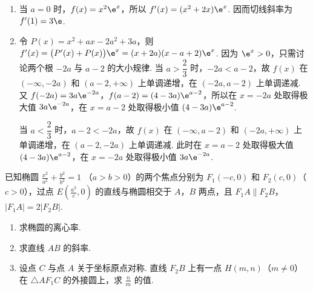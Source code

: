 \begin{solution}
\begin{enumerate}
\item 当 \(a=0\) 时，\(f(x)=x^2\e^x\)，所以 \(f'(x)=(x^2+2x)\e^x\). 因而切线斜率为 \(f'(1)=3\e\).
\item 令 \(P(x)=x^2+ax-2a^2+3a\)，则
\(f'(x)=\bigl(P'(x)+P(x)\bigr)\e^x=(x+2a)(x-a+2)\e^x\).
因为 \(\e^x>0\)，只需讨论两个根 \(-2a\) 与 \(a-2\) 的大小规律. 当 \(a>\dfrac23\) 时，\(-2a<a-2\)，故 \(f(x)\) 在 \(\left(-\infty,-2a\right)\) 和 \(\left(a-2,+\infty\right)\) 上单调递增，在 \(\left(-2a,a-2\right)\) 上单调递减. 又
\(f(-2a)=3a\e^{-2a}\)，\(f(a-2)=(4-3a)\e^{a-2}\)，所以在 \(x=-2a\) 处取得极大值 \(3a\e^{-2a}\)，在 \(x=a-2\) 处取得极小值 \((4-3a)\e^{a-2}\).

当 \(a<\dfrac23\) 时，\(a-2<-2a\)，故 \(f(x)\) 在 \(\left(-\infty,a-2\right)\) 和 \(\left(-2a,+\infty\right)\) 上单调递增，在 \(\left(a-2,-2a\right)\) 上单调递减. 此时在 \(x=a-2\) 处取得极大值 \((4-3a)\e^{a-2}\)，在 \(x=-2a\) 处取得极小值 \(3a\e^{-2a}\).
\end{enumerate}
\end{solution}

\begin{problem}
已知椭圆 \(\frac{x^2}{a^2} + \frac{y^2}{b^2} = 1\) （\(a > b > 0\)）的两个焦点分别为 \(F_1(-c, 0)\) 和 \(F_2(c, 0)\)（\(c > 0\)），过点 \(E\left(\frac{a^2}{c}, 0\right)\) 的直线与椭圆相交于 \(A\)，\(B\) 两点，且 \(F_1A \parallel F_2B\)，\(|F_1A| = 2|F_2B|\).

\begin{enumerate}
\item 求椭圆的离心率.
\item 求直线 \(AB\) 的斜率.
\item 设点 \(C\) 与点 \(A\) 关于坐标原点对称. 直线 \(F_{2}B\) 上有一点 \(H(m,n)\)（\(m \neq 0\)）在 \(\triangle AF_{1}C\) 的外接圆上，求 \(\frac{n}{m}\) 的值.
\end{enumerate}
\end{problem}

